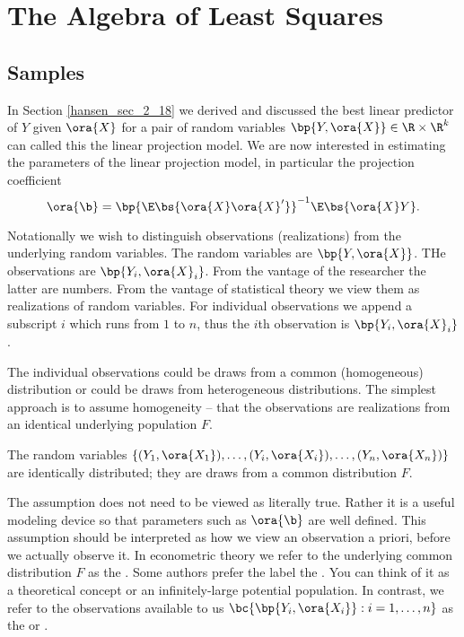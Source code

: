 
\chapter{The Algebra of Least Squares}



\setcounter{section}{1}
\section{Samples}


In Section \ref{hansen_sec_2_18} we derived and discussed the best linear predictor of $Y$ given $\ora{X}$ for a pair of random variables $\bp{Y, \ora{X}} \in \R \times \R^k$ can called this the linear projection model. We are now interested in estimating the parameters of the linear projection model, in particular the projection coefficient
\begin{equation}
    \label{hansen_eq_3_1}
    \ora{\b} = \bp{\E\bs{\ora{X}\ora{X}^\prime}}^{-1} \E\bs{\ora{X}Y}.
\end{equation}

Notationally we wish to distinguish observations (realizations) from the underlying random variables. The random variables are $\bp{Y, \ora{X}}$. THe observations are $\bp{Y_i, \ora{X}_i}$. From the vantage of the researcher the latter are numbers. From the vantage of statistical theory we view them as realizations of random variables. For individual observations we append a subscript $i$ which runs from $1$ to $n$, thus the $i$th observation is $\bp{Y_i, \ora{X}_i}$. 

The individual observations could be draws from a common (homogeneous) distribution or could be draws from heterogeneous distributions. The simplest approach is to assume homogeneity -- that the observations are realizations from an identical underlying population $F$.

\setcounter{assumption}{0}
\begin{assumption} \label{hansen_ass_3_1}
    The random variables $\left\{(Y_1, \ora{X_1}), \ldots, (Y_i, \ora{X_i}), \ldots, (Y_n, \ora{X_n})\right\}$ are identically distributed; they are draws from a common distribution $F$.
\end{assumption}

The assumption does not need to be viewed as literally true. Rather it is a useful modeling device so that parameters such as $\ora{\b}$ are well defined. This assumption should be interpreted as how we view an observation a priori, before we actually observe it. In econometric theory we refer to the underlying common distribution $F$ as the . Some authors prefer the label the . You can think of it as a theoretical concept or an infinitely-large potential population. In contrast, we refer to the observations available to us $\bc{\bp{Y_i, \ora{X_i}}: i=1,\ldots,n}$ as the  or .

